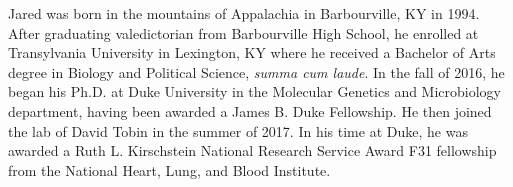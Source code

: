\documentclass[PhD]{dukethesis2006}
\begin{document}
\nocite{*}


	
\biography

\begin{doublespace}

Jared was born in the mountains of Appalachia in Barbourville, KY in 1994. After graduating valedictorian from Barbourville High School, he enrolled at Transylvania University in Lexington, KY where he received a Bachelor of Arts degree in Biology and Political Science, \textit{summa cum laude}. In the fall of 2016, he began his Ph.D. at Duke University in the Molecular Genetics and Microbiology department, having been awarded a James B. Duke Fellowship. He then joined the lab of David Tobin in the summer of 2017. In his time at Duke, he was awarded a Ruth L. Kirschstein National Research Service Award F31 fellowship from the National Heart, Lung, and Blood Institute.

\end{doublespace}
\end{document}

